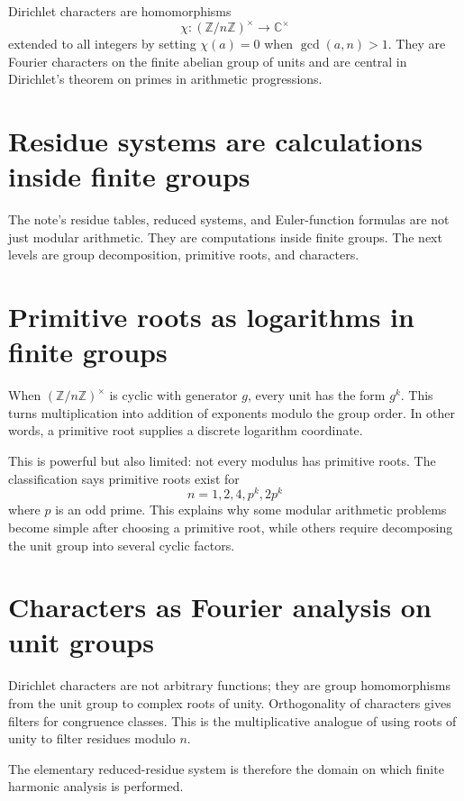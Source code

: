 Dirichlet characters are homomorphisms
\[
  \chi:(\mathbb Z/n\mathbb Z)^\times\to\mathbb C^\times
\]
extended to all integers by setting $\chi(a)=0$ when $\gcd(a,n)>1$.  They are Fourier characters on the finite abelian group of units and are central in Dirichlet's theorem on primes in arithmetic progressions.

\section{Residue systems are calculations inside finite groups}

The note's residue tables, reduced systems, and Euler-function formulas are not just modular arithmetic.  They are computations inside finite groups.  The next levels are group decomposition, primitive roots, and characters.

\section{Primitive roots as logarithms in finite groups}

When $(\mathbb Z/n\mathbb Z)^\times$ is cyclic with generator $g$, every unit has the form $g^k$.  This turns multiplication into addition of exponents modulo the group order.  In other words, a primitive root supplies a discrete logarithm coordinate.

This is powerful but also limited: not every modulus has primitive roots.  The classification says primitive roots exist for
\[
  n=1,2,4,p^k,2p^k
\]
where $p$ is an odd prime.  This explains why some modular arithmetic problems become simple after choosing a primitive root, while others require decomposing the unit group into several cyclic factors.

\section{Characters as Fourier analysis on unit groups}

Dirichlet characters are not arbitrary functions; they are group homomorphisms from the unit group to complex roots of unity.  Orthogonality of characters gives filters for congruence classes.  This is the multiplicative analogue of using roots of unity to filter residues modulo $n$.

The elementary reduced-residue system is therefore the domain on which finite harmonic analysis is performed.
